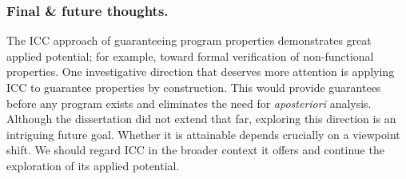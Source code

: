 \subsubsection*{Final \& future thoughts.}
The ICC approach of guaranteeing program properties demonstrates great applied potential;
for example, toward formal verification of non-functional properties.
One investigative direction that deserves more attention is applying ICC to guarantee properties by construction.
This would provide guarantees before any program exists and eliminates the need for \emph{aposteriori} analysis.
Although the dissertation did not extend that far, exploring this direction is an intriguing future goal.
Whether it is attainable depends crucially on a viewpoint shift.
We should regard ICC in the broader context it offers and continue the exploration of its applied potential.
